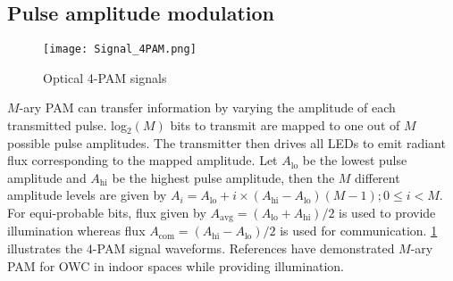 \subsection{Pulse amplitude modulation}
\label{subsec:sisoModulationPAM}
\begin{figure}[!t]
	\centering
		\texttt{[image: Signal\_4PAM.png]}
		\caption[Optical PAM signals]{Optical 4-PAM signals}
		\label{fig:sisoSig4PAM}
\end{figure}
$M$-ary PAM can transfer information by varying the amplitude of each transmitted pulse. log$^{ }_{2}(M)$ bits to transmit are mapped to one out of $M$ possible pulse amplitudes. The transmitter then drives all LEDs to emit radiant flux corresponding to the mapped amplitude. Let $A_{\text{lo}}$ be the lowest pulse amplitude and $A_{\text{hi}}$ be the highest pulse amplitude, then the $M$ different amplitude levels are given by $A_{i} = A_{\text{lo}} + i\times(A_{\text{hi}}-A_{\text{lo}})(M-1); 0\leq i<M$. For equi-probable bits, flux given by $A_{\text{avg}} = (A_{\text{lo}} + A_{\text{hi}})/2$ is used to provide illumination whereas flux $A_{\text{com}} = (A_{\text{hi}}-A_{\text{lo}})/2$ is used for communication. \figurename{ \ref{fig:sisoSig4PAM}} illustrates the $4$-PAM signal waveforms. References \cite{gru08b} have demonstrated $M$-ary PAM for OWC in indoor spaces while providing illumination.


